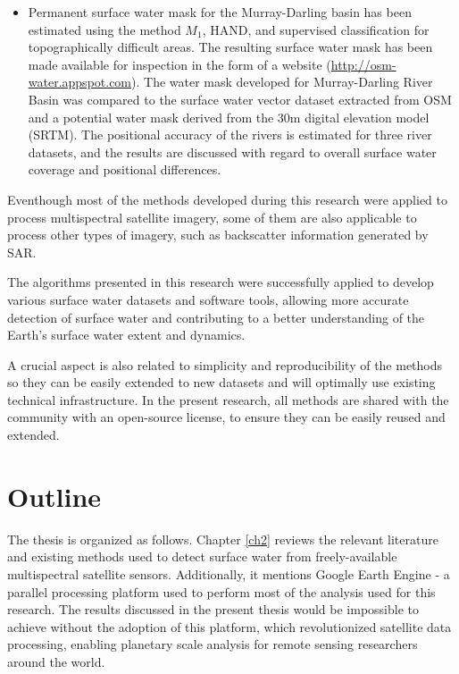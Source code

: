 \begin{itemize}
	\item Permanent surface water mask for the Murray-Darling basin has been estimated using the method $M_1$, \gls{HAND}, and supervised classification for topographically difficult areas. The resulting surface water mask has been made available for inspection in the form of a website (\url{http://osm-water.appspot.com}). The water mask developed for Murray-Darling River Basin was compared to the surface water vector dataset extracted from \gls{OSM} and a potential water mask derived from the 30m digital elevation model (\gls{SRTM}). The positional accuracy of the rivers is estimated for three river datasets, and the results are discussed with regard to overall surface water coverage and positional differences.    
\end{itemize}

Eventhough most of the methods developed during this research were applied to process multispectral satellite imagery, some of them are also applicable to process other types of imagery, such as backscatter information generated by \gls{SAR}.

The algorithms presented in this research were successfully applied to develop various surface water datasets and software tools, allowing more accurate detection of surface water and contributing to a better understanding of the Earth's surface water extent and dynamics.

A crucial aspect is also related to simplicity and reproducibility of the methods so they can be easily extended to new datasets and will optimally use existing technical infrastructure. In the present research, all methods are shared with the community with an open-source license, to ensure they can be easily reused and extended.

\section{Outline}

The thesis is organized as follows. Chapter \ref{ch2} reviews the relevant literature and existing methods used to detect surface water from freely-available multispectral satellite sensors. Additionally, it mentions Google Earth Engine - a parallel processing platform used to perform most of the analysis used for this research. The results discussed in the present thesis would be impossible to achieve without the adoption of this platform, which revolutionized satellite data processing, enabling planetary scale analysis for remote sensing researchers around the world. 

